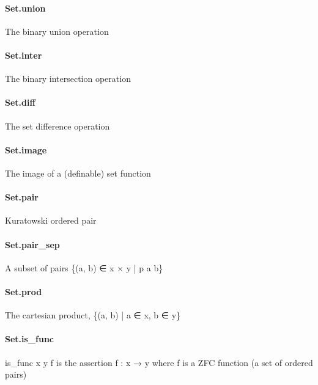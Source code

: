 \documentclass{article}
\begin{document}
\paragraph{Set.union}
\par
The binary union operation
\paragraph{Set.inter}
\par
The binary intersection operation
\paragraph{Set.diff}
\par
The set difference operation
\paragraph{Set.image}
\par
The image of a (definable) set function
\paragraph{Set.pair}
\par
Kuratowski ordered pair
\paragraph{Set.pair\_sep}
\par
A subset of pairs 
\colorbox[RGB]{253,246,227}{{{{\color[RGB]{101, 123, 131} \{(a, b) ∈ x × y | p a b\} }}}}\paragraph{Set.prod}
\par
The cartesian product, 
\colorbox[RGB]{253,246,227}{{{{\color[RGB]{101, 123, 131} \{(a, b) | a ∈ x, b ∈ y\} }}}}\paragraph{Set.is\_func}
\par
\colorbox[RGB]{253,246,227}{{{{\color[RGB]{101, 123, 131} is\_func x y f }}}} is the assertion 
\colorbox[RGB]{253,246,227}{{{{\color[RGB]{101, 123, 131} f : x  }}}{{{\color[RGB]{133, 153, 0} → }}}{{{\color[RGB]{101, 123, 131}  y }}}} where 
\colorbox[RGB]{253,246,227}{{{{\color[RGB]{101, 123, 131} f }}}} is a ZFC function
(a set of ordered pairs)
\end{document}
